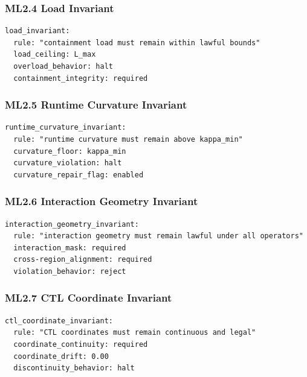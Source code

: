 \subsubsection*{ML2.4 Load Invariant}

\begin{verbatim}
load_invariant:
  rule: "containment load must remain within lawful bounds"
  load_ceiling: L_max
  overload_behavior: halt
  containment_integrity: required
\end{verbatim}

\subsubsection*{ML2.5 Runtime Curvature Invariant}

\begin{verbatim}
runtime_curvature_invariant:
  rule: "runtime curvature must remain above kappa_min"
  curvature_floor: kappa_min
  curvature_violation: halt
  curvature_repair_flag: enabled
\end{verbatim}

\subsubsection*{ML2.6 Interaction Geometry Invariant}

\begin{verbatim}
interaction_geometry_invariant:
  rule: "interaction geometry must remain lawful under all operators"
  interaction_mask: required
  cross-region_alignment: required
  violation_behavior: reject
\end{verbatim}

\subsubsection*{ML2.7 CTL Coordinate Invariant}

\begin{verbatim}
ctl_coordinate_invariant:
  rule: "CTL coordinates must remain continuous and legal"
  coordinate_continuity: required
  coordinate_drift: 0.00
  discontinuity_behavior: halt
\end{verbatim}

